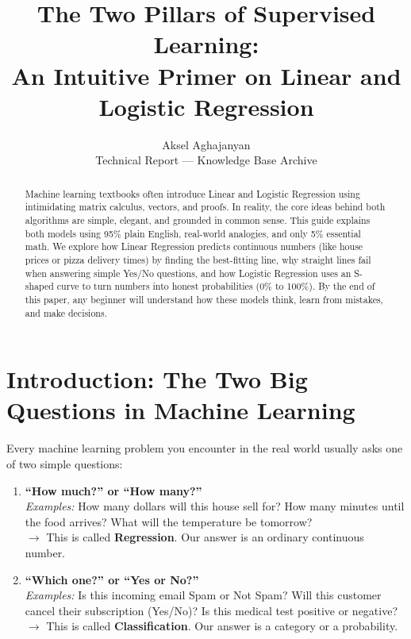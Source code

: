 \documentclass[11pt,journal,onecolumn]{IEEEtran}
\begin{document}
\title{The Two Pillars of Supervised Learning: \\ An Intuitive Primer on Linear and Logistic Regression}

\author{Aksel Aghajanyan \\ \small Technical Report --- Knowledge Base Archive}

\maketitle

\begin{abstract}
Machine learning textbooks often introduce Linear and Logistic Regression using intimidating matrix calculus, vectors, and proofs. In reality, the core ideas behind both algorithms are simple, elegant, and grounded in common sense. This guide explains both models using 95\% plain English, real-world analogies, and only 5\% essential math. We explore how Linear Regression predicts continuous numbers (like house prices or pizza delivery times) by finding the best-fitting line, why straight lines fail when answering simple Yes/No questions, and how Logistic Regression uses an S-shaped curve to turn numbers into honest probabilities (0\% to 100\%). By the end of this paper, any beginner will understand how these models think, learn from mistakes, and make decisions.
\end{abstract}

\section{Introduction: The Two Big Questions in Machine Learning}

Every machine learning problem you encounter in the real world usually asks one of two simple questions:

\begin{enumerate}
    \item \textbf{``How much?'' or ``How many?''} \\
    \textit{Examples:} How many dollars will this house sell for? How many minutes until the food arrives? What will the temperature be tomorrow? \\
    $\rightarrow$ This is called \textbf{Regression}. Our answer is an ordinary continuous number.
    
    \item \textbf{``Which one?'' or ``Yes or No?''} \\
    \textit{Examples:} Is this incoming email Spam or Not Spam? Will this customer cancel their subscription (Yes/No)? Is this medical test positive or negative? \\
    $\rightarrow$ This is called \textbf{Classification}. Our answer is a category or a probability.
\end{enumerate}
\end{document}
